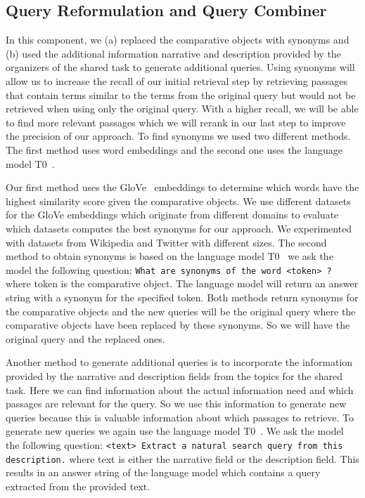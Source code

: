     \subsection{Query Reformulation and Query Combiner} \label{reformulation}
        In this component, we (a) replaced the comparative objects with synonyms and (b) used the additional information narrative and description provided by the organizers of the shared task to generate additional queries. Using synonyms will allow us to increase the recall of our initial retrieval step by retrieving passages that contain terms similar to the terms from the original query but would not be retrieved when using only the original query. With a higher recall, we will be able to find more relevant passages which we will rerank in our last step to improve the precision of our approach. To find synonyms we used two different methods. The first method uses word embeddings and the second one uses the language model T0~\cite{SanhWRBSACSLRDBXTSSKCNDCJWMSYPBWNRSSFFTBGBWR2021}.\par
        Our first method uses the GloVe~\cite{PenningtonSM2014} embeddings to determine which words have the highest similarity score given the comparative objects. We use different datasets for the GloVe embeddings which originate from different domains to evaluate which datasets computes the best synonyms for our approach. We experimented with datasets from Wikipedia and Twitter with different sizes. The second method to obtain synonyms is based on the language model T0~\cite{SanhWRBSACSLRDBXTSSKCNDCJWMSYPBWNRSSFFTBGBWR2021} we ask the model the following question: \texttt{What are synonyms of the word <token> ?} where token is the comparative object. The language model will return an answer string with a synonym for the specified token. Both methods return synonyms for the comparative objects and the new queries will be the original query where the comparative objects have been replaced by these synonyms. So we will have the original query and the replaced ones.\par
        Another method to generate additional queries is to incorporate the information provided by the narrative and description fields from the topics for the shared task. Here we can find information about the actual information need and which passages are relevant for the query. So we use this information to generate new queries because this is valuable information about which passages to retrieve. To generate new queries we again use the language model T0~\cite{SanhWRBSACSLRDBXTSSKCNDCJWMSYPBWNRSSFFTBGBWR2021}. We ask the model the following question: \texttt{<text> Extract a natural search query from this description.} where text is either the narrative field or the description field. This results in an answer string of the language model which contains a query extracted from the provided text.\par
